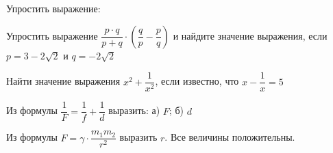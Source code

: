 \begin{listofex}
	\item Упростить выражение:
	\begin{enumcols}[itemcolumns=2]
		\item {}
		\item {}
	\end{enumcols}
	
	\item Упростить выражение \( \dfrac{p\cdot q}{p+q}\cdot\left( \dfrac{q}{p}-\dfrac{p}{q} \right) \) и найдите значение выражения, если \( p=3-2\sqrt{2} \) и \( q=-2\sqrt{2} \)
	
	\item Найти значение выражения \( x^2+\dfrac{1}{x^2} \), если известно, что \( x-\dfrac{1}{x}=5 \)
	
	\item Из формулы \( \dfrac{1}{F}=\dfrac{1}{f}+\dfrac{1}{d} \) выразить: а) \( F \); б) \( d \)
	
	\item Из формулы \( F=\gamma\cdot\dfrac{m_1m_2}{r^2} \) выразить \( r \). Все величины положительны.
	

\end{listofex}
